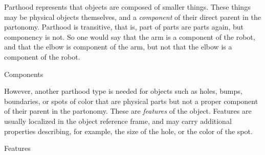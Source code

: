 Parthood represents that objects are composed of smaller things.
These things may be physical objects themselves, and a \emph{component} of their direct parent in the partonomy.
Parthood is transitive, that is, part of parts are parts again, but componency is not.
So one would say that the arm is a component of the robot, and that the elbow is component of the arm, but not that the elbow is a component of the robot.

\begin{ODP}{Components}
\end{ODP}

However, another parthood type is needed for objects such as holes, bumps, boundaries, or spots of color that are physical parts but not a proper component of their parent in the partonomy.
These are \emph{features} of the object.
Features are usually localized in the object reference frame, and may carry additional properties describing, for example, the size of the hole, or the color of the spot.

\begin{ODP}{Features}
\end{ODP}

